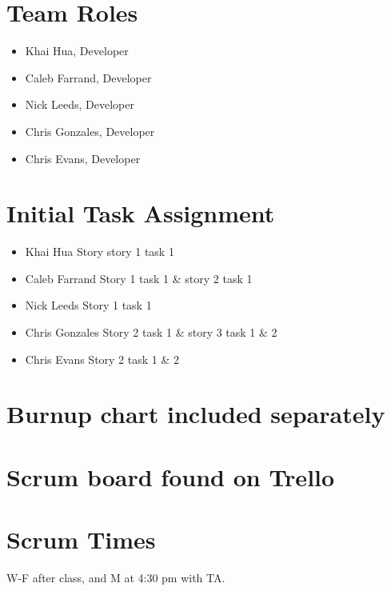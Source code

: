 \documentclass[11pt]{article}
\begin{document}
	\section{Team Roles}
		\vspace{-3mm}
		\begin{itemize}
		    \item Khai Hua, Developer
		    \item Caleb Farrand, Developer
		    \item Nick Leeds, Developer
		    \item Chris Gonzales, Developer
		    \item Chris Evans, Developer
		\end{itemize}
	\section{Initial Task Assignment}
	    \vspace{-3mm}
	    \begin{itemize}
		    \item Khai Hua Story story 1 task 1
		    \item Caleb Farrand Story 1 task 1 \& story 2 task 1
		    \item Nick Leeds Story 1 task 1
		    \item Chris Gonzales Story 2 task 1 \& story 3 task 1 \& 2
		    \item Chris Evans Story 2 task 1 \& 2
		\end{itemize}
	\section{Burnup chart included separately}
	\section{Scrum board found on Trello}
	\section{Scrum Times}
	    W-F after class, and M at 4:30 pm with TA.
\end{document}
